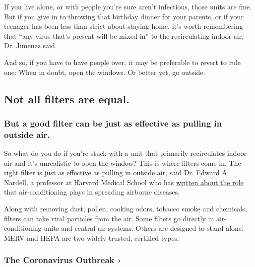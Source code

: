If you live alone, or with people you're sure aren't infectious, those
units are fine. But if you give in to throwing that birthday dinner for
your parents, or if your teenager has been less than strict about
staying home, it's worth remembering that ``any virus that's present
will be mixed in'' to the recirculating indoor air, Dr. Jimenez said.

And so, if you have to have people over, it may be preferable to revert
to rule one: When in doubt, open the windows. Or better yet, go outside.

\hypertarget{not-all-filters-are-equal}{%
\subsection{Not all filters are
equal.}\label{not-all-filters-are-equal}}

\hypertarget{but-a-good-filter-can-be-just-as-effective-as-pulling-in-outside-air}{%
\subsubsection{But a good filter can be just as effective as pulling in
outside
air.}\label{but-a-good-filter-can-be-just-as-effective-as-pulling-in-outside-air}}

So what do you do if you're stuck with a unit that primarily
recirculates indoor air and it's unrealistic to open the window? This is
where filters come in. The right filter is just as effective as pulling
in outside air, said Dr. Edward A. Nardell, a professor at Harvard
Medical School who has
\href{https://onlinelibrary.wiley.com/doi/full/10.1111/ina.12608}{written
about the role} that air-conditioning plays in spreading airborne
diseases.

Along with removing dust, pollen, cooking odors, tobacco smoke and
chemicals, filters can take viral particles from the air. Some filters
go directly in air-conditioning units and central air systems. Others
are designed to stand alone. MERV and HEPA are two widely trusted,
certified types.

\href{https://www.nytimes.com/news-event/coronavirus?action=click\&pgtype=Article\&state=default\&region=MAIN_CONTENT_3\&context=storylines_faq}{}

\hypertarget{the-coronavirus-outbreak-}{%
\subsubsection{The Coronavirus Outbreak
›}\label{the-coronavirus-outbreak-}}


